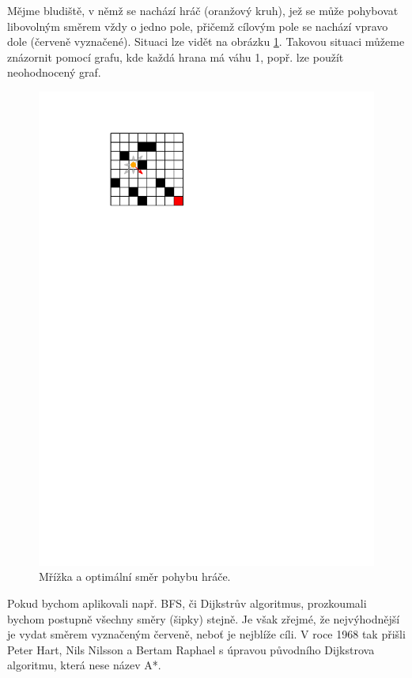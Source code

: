 Mějme bludiště, v němž se nachází hráč (oranžový kruh), jež se může pohybovat libovolným směrem vždy o jedno pole, přičemž cílovým pole se nachází vpravo dole (červeně vyznačené). Situaci lze vidět na obrázku \ref{fig:mrizka}. Takovou situaci můžeme znázornit pomocí grafu, kde každá hrana má váhu 1, popř. lze použít neohodnocený graf.
\begin{figure}[h]
    \centering
    \includegraphics[scale=1.2]{01-grafalgo/images/ch01_mrizka.pdf}
    \caption{Mřížka a optimální směr pohybu hráče.}
    \label{fig:mrizka}
\end{figure}
Pokud bychom aplikovali např. BFS, či Dijkstrův algoritmus, prozkoumali bychom postupně všechny směry (šipky) stejně. Je však zřejmé, že nejvýhodnější je vydat směrem vyznačeným červeně, neboť je nejblíže cíli. V roce 1968 tak přišli Peter Hart, Nils Nilsson a Bertam Raphael s úpravou původního Dijkstrova algoritmu, která nese název A*.


